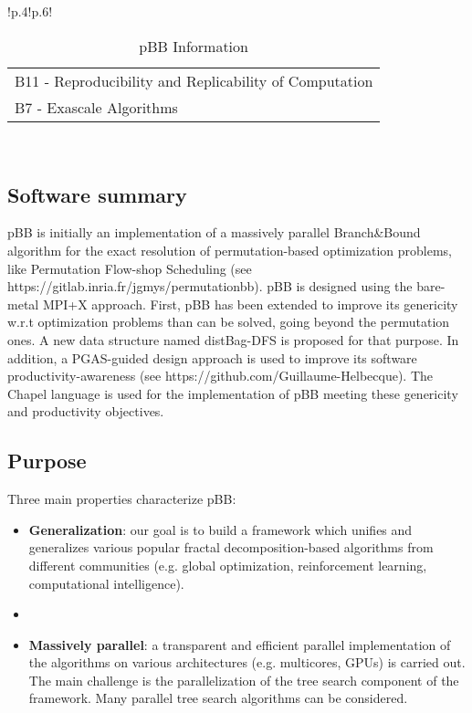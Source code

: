 \begin{table}[h!]
{{\begin{tabular}{!{\color{numpexgray}\vrule}p{.4\textwidth}!{\color{numpexgray}\vrule}p{.6\textwidth}!{\color{numpexgray}\vrule}}
\begin{tabular}{l}
B11 - Reproducibility and Replicability of Computation\\
B7 - Exascale Algorithms\\
\end{tabular} \\
        \bottomrule
    \end{tabular}
    }}
    \caption{pBB Information}
\end{table}

\subsection{Software summary}
\label{sec:pBB:summary}

pBB is initially an implementation of a massively parallel Branch\&Bound algorithm for the exact resolution of permutation-based optimization problems, like Permutation Flow-shop Scheduling (see https://gitlab.inria.fr/jgmys/permutationbb). pBB is designed using the bare-metal MPI+X approach. First, pBB has been extended to improve its genericity w.r.t optimization problems than can be solved, going beyond the permutation ones. A new data structure named distBag-DFS is proposed for that purpose. In addition, a PGAS-guided design approach is used to improve its software productivity-awareness (see https://github.com/Guillaume-Helbecque). The Chapel language is used for the implementation of pBB meeting these genericity and productivity objectives. 

\subsection{Purpose}
\label{sec:pBB:purpose}
Three main properties characterize pBB:
\begin{itemize}
    \item \textbf{Generalization}: our goal is to build a framework which unifies and generalizes various popular fractal decomposition-based algorithms from different communities (e.g. global optimization, reinforcement learning, computational intelligence).

    \item

    \item \textbf{Massively parallel}: a transparent and efficient parallel implementation of the algorithms on various architectures (e.g. multicores, GPUs) is carried out. The main challenge is the parallelization of the tree search component of the framework. Many parallel tree search algorithms can be considered.
\end{itemize}

